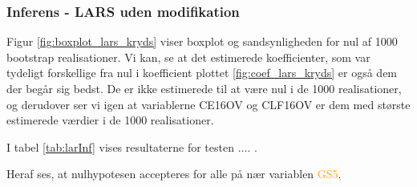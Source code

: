 \newpage
\subsubsection{Inferens - LARS uden modifikation}
Figur \ref{fig:boxplot_lars_kryds} viser boxplot og sandsynligheden for nul af 1000 bootstrap realisationer. 
Vi kan, se at det estimerede koefficienter, som var tydeligt forskellige fra nul i koefficient plottet  \ref{fig:coef_lars_kryds} er også dem der begår sig bedst. 
De er ikke estimerede til at være nul i de 1000 realisationer, og derudover ser vi igen at variablerne  \textcolor{blue3}{CE16OV} og \textcolor{blue3}{CLF16OV} er dem med største estimerede værdier i de 1000 realisationer. 


I tabel \ref{tab:larInf} vises resultaterne for testen .... .
%

%
Heraf ses, at nulhypotesen accepteres for alle på nær variablen \textcolor{orange}{GS5}. 








\newpage
